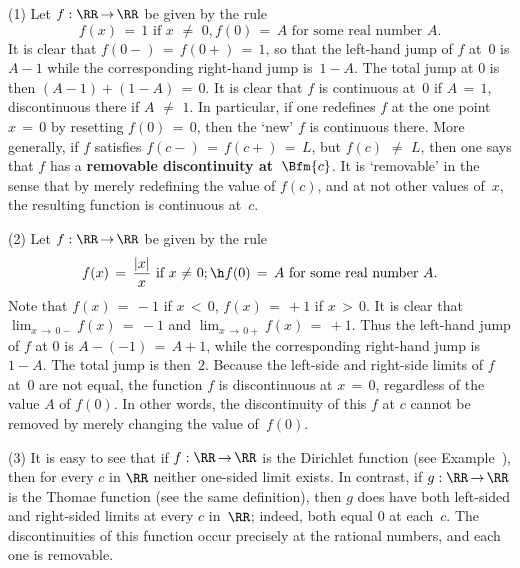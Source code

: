         (1) Let $f:{\RR} \,{\rightarrow}\, {\RR}$ be given by the rule
        \begin{displaymath}
        f(x) \,=\, 1 \mbox{ if $x \,\,{\neq}\,\, 0$}, f(0) \,=\, A \mbox{ for some real number~$A$}.
        \end{displaymath}
    It is clear that $f(0-) \,=\, f(0+) \,=\, 1$, so that the left-hand jump of $f$ at~$0$ is $A-1$ while the corresponding right-hand jump is~$1-A$.
    The total jump at $0$ is then $(A-1) + (1-A) \,=\, 0$. It is clear that $f$ is continuous at~$0$ if $A \,=\, 1$,
    discontinuous there if $A \,\,{\neq}\,\, 1$. In particular, if one redefines $f$ at the one point $x \,=\, 0$ by resetting $f(0) \,=\, 0$,
    then the `new' $f$ is continuous there. More generally,  if $f$ satisfies $f(c-) \,=\, f(c+) \,=\, L$,
    but $f(c) \,\,{\neq}\,\, L$,
then one says that $f$ has a {\bf removable discontinuity at~$\Bfm{c}$}. It is `removable' in the sense that by merely redefining the value of $f(c)$,
    and at not other values of~$x$, the resulting function is continuous at~$c$.
 

\V

        (2) Let $f:{\RR} \,{\rightarrow}\, {\RR}$ be given by the rule
        \begin{displaymath}
        f(x) \,=\, \frac{|x|}{x} \mbox{ if $x \,\,{\neq}\,\, 0$}; \h
        f(0) \,=\, A \mbox{ for some real number~$A$}.
        \end{displaymath}
        Note that $f(x) \,=\, -1$ if $x\,<\,0$, $f(x) \,=\, +1$ if $x\,>\,0$. It is clear that
    $\lim_{x \,{\rightarrow}\, 0-} f(x) \,=\, -1$ and $\lim_{x \,{\rightarrow}\, 0+} f(x) \,=\, +1$.
    Thus the left-hand jump of $f$ at $0$ is $A-(-1) \,=\, A+1$, while the corresponding right-hand jump is $1-A$. The total jump is then~$2$.
    Because the left-side and right-side limits of $f$ at~$0$ are not equal, the function $f$ is discontinuous at $x \,=\, 0$,
    regardless of the value $A$ of $f(0)$. In other words, the discontinuity of this $f$ at $c$ cannot be removed by merely changing the value of~$f(0)$.

\V

        (3) It is easy to see that if $f:{\RR} \,{\rightarrow}\, {\RR}$ is the Dirichlet function (see Example~),
    then for every $c$ in ${\RR}$ neither one-sided limit exists. In contrast, if $g:{\RR} \,{\rightarrow}\, {\RR}$
    is the Thomae function (see the same definition), then $g$ does have both left-sided and right-sided limits at every $c$ in~${\RR}$;
    indeed, both equal $0$ at each~$c$. The discontinuities of this function occur precisely at the rational numbers, and each one is removable.

